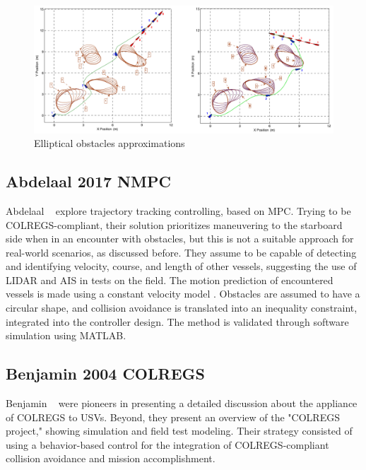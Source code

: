     \begin{figure}[H]
        \centering
        \includegraphics[scale=0.3]{figs/Chap3/Soltan2009Trajectory_SimulateTests_Ellipsses.png}
        \caption{Elliptical obstacles approximations \cite{Soltan2009Trajectory}}
        \label{fig:Soltan2009Trajectory_SimulateTests_Ellipsses}
    \end{figure}
    
    
    \subsection{Abdelaal 2017 NMPC}
    Abdelaal \etal~\cite{Abdelaal2017NMPC, Abdelaal2018Nonlinear} explore trajectory tracking controlling, based on \ac{MPC}. Trying to be COLREGS-compliant, their solution prioritizes maneuvering to the starboard side when in an encounter with obstacles, but this is not a suitable approach for real-world scenarios, as discussed before. They assume to be capable of detecting and identifying velocity, course, and length of other vessels, suggesting the use of \ac{LIDAR} and \ac{AIS} in tests on the field. The motion prediction of encountered vessels is made using a constant velocity model \cite{Rong2003Survey}. Obstacles are assumed to have a circular shape, and collision avoidance is translated into an inequality constraint, integrated into the controller design. The method is validated through software simulation using MATLAB.
    
    \subsection{Benjamin 2004 COLREGS}
    Benjamin \etal~\cite{Benjamin2004COLREGS} were pioneers in presenting a detailed discussion about the appliance of \ac{COLREGS} to USVs. Beyond, they present an overview of the "COLREGS project," showing simulation and field test modeling. Their strategy consisted of using a behavior-based control for the integration of \ac{COLREGS}-compliant collision avoidance and mission accomplishment.
    

